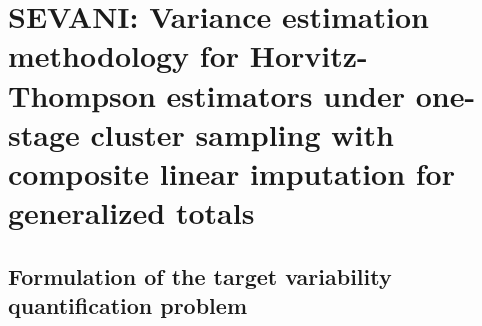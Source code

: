 

\section{SEVANI: Variance estimation methodology \cite{Beaumont2011} for {\color{red}Horvitz-Thompson} estimators under one-stage cluster sampling with composite linear imputation for {\color{red}generalized totals}}
\label{GeneralizedTotalSEVANI}


\subsection{Formulation of the target variability quantification problem}
\label{GeneralizedTotalFormulationOfVarianceEstimationProblem}
\setcounter{theorem}{0}


